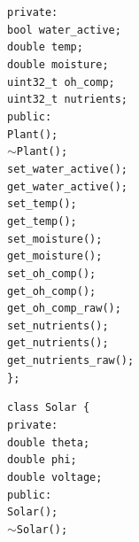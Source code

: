 \begin{flushleft}
\begin{flushleft}
        \quad\texttt{private:} \\
        \quad\quad\texttt{bool water\_active;} \\
        \quad\quad\texttt{double temp;} \\
        \quad\quad\texttt{double moisture;} \\
        \quad\quad\texttt{uint32\_t oh\_comp;} \\
        \quad\quad\texttt{uint32\_t nutrients;} \\
        \quad\texttt{public:} \\
        \quad\quad\texttt{Plant();} \\
        \quad\quad\texttt{$\sim$Plant();} \\
        \quad\quad\texttt{set\_water\_active();} \\
        \quad\quad\texttt{get\_water\_active();} \\
        \quad\quad\texttt{set\_temp();} \\
        \quad\quad\texttt{get\_temp();} \\
        \quad\quad\texttt{set\_moisture();} \\
        \quad\quad\texttt{get\_moisture();} \\
        \quad\quad\texttt{set\_oh\_comp();} \\
        \quad\quad\texttt{get\_oh\_comp();} \\
        \quad\quad\texttt{get\_oh\_comp\_raw();} \\
        \quad\quad\texttt{set\_nutrients();} \\
        \quad\quad\texttt{get\_nutrients();} \\
        \quad\quad\texttt{get\_nutrients\_raw();} \\
        \texttt{\};} \\
    \end{flushleft}
    \begin{flushleft}
        \texttt{class Solar \{}  \\
        \quad\texttt{private:} \\
        \quad\quad\texttt{double theta;} \\
        \quad\quad\texttt{double phi;} \\
        \quad\quad\texttt{double voltage;} \\
        \quad\texttt{public:} \\
        \quad\quad\texttt{Solar();} \\
        \quad\quad\texttt{$\sim$Solar();} \\

\end{flushleft}
\end{flushleft}
